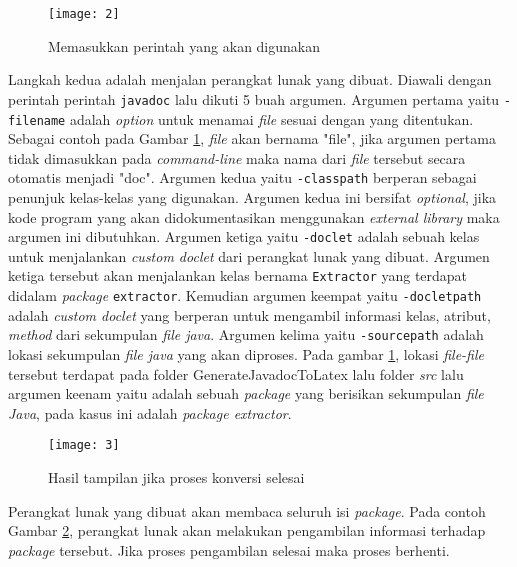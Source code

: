 \begin{figure}[H]
	\centering  
	\texttt{[image: 2]}  
	\caption[]{Memasukkan perintah yang akan digunakan} 
	\label{fig:2} 
\end{figure}
Langkah kedua adalah menjalan perangkat lunak yang dibuat. Diawali dengan perintah perintah \texttt{javadoc} lalu dikuti 5 buah argumen. Argumen pertama yaitu {\tt -filename} adalah {\it option} untuk menamai {\it file} sesuai dengan yang ditentukan. Sebagai contoh pada Gambar \ref{fig:2}, {\it file} akan bernama "file", jika argumen pertama tidak dimasukkan pada {\it command-line} maka nama dari {\it file} tersebut secara otomatis menjadi "doc". Argumen kedua yaitu {\tt -classpath} berperan sebagai penunjuk kelas-kelas yang digunakan. Argumen kedua ini bersifat {\it optional}, jika kode program yang akan didokumentasikan menggunakan {\it external library} maka argumen ini dibutuhkan. Argumen ketiga yaitu {\tt -doclet} adalah sebuah kelas untuk menjalankan {\it custom doclet} dari perangkat lunak yang dibuat. Argumen ketiga tersebut akan menjalankan kelas bernama \texttt{Extractor} yang terdapat didalam {\it package} \texttt{extractor}. Kemudian argumen keempat yaitu {\tt -docletpath} adalah {\it custom doclet} yang berperan untuk mengambil informasi kelas, atribut, {\it method} dari sekumpulan {\it file java}. Argumen kelima yaitu {\tt -sourcepath} adalah lokasi sekumpulan {\it file java} yang akan diproses. Pada gambar \ref{fig:2}, lokasi {\it file-file} tersebut terdapat pada folder GenerateJavadocToLatex lalu folder {\it src} lalu argumen keenam yaitu adalah sebuah {\it package} yang berisikan sekumpulan {\it file Java}, pada kasus ini adalah {\it package extractor}.

\begin{figure}[H]
	\centering  
	\texttt{[image: 3]}  
	\caption[]{Hasil tampilan jika proses konversi selesai} 
	\label{fig:3} 
\end{figure}
Perangkat lunak yang dibuat akan membaca seluruh isi {\it package}. Pada contoh Gambar \ref{fig:3}, perangkat lunak akan melakukan pengambilan informasi terhadap {\it package} tersebut. Jika proses pengambilan selesai maka proses berhenti.
























